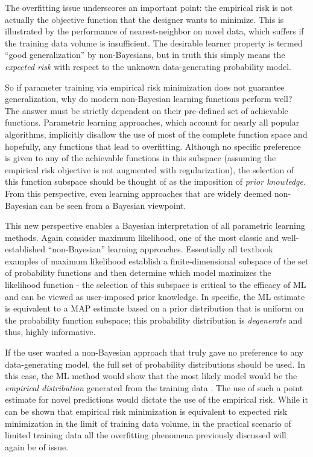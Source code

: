 \documentclass[12pt]{article}
\begin{document}
The overfitting issue underscores an important point: the empirical risk is not actually the objective function that the designer wants to minimize. This is illustrated by the performance of nearest-neighbor on novel data, which suffers if the training data volume is insufficient. The desirable learner property is termed ``good generalization'' by non-Bayesians, but in truth this simply means the \emph{expected risk} with respect to the unknown data-generating probability model. 

So if parameter training via empirical risk minimization does not guarantee generalization, why do modern non-Bayesian learning functions perform well? The answer must be strictly dependent on their pre-defined set of achievable functions. Parametric learning approaches, which account for nearly all popular algorithms, implicitly disallow the use of most of the complete function space and hopefully, any functions that lead to overfitting. Although no specific preference is given to any of the achievable functions in this subspace (assuming the empirical risk objective is not augmented with regularization), the selection of this function subspace should be thought of as the imposition of \emph{prior knowledge}. From this perspective, even learning approaches that are widely deemed non-Bayesian can be seen from a Bayesian viewpoint.

This new perspective enables a Bayesian interpretation of all parametric learning methods. Again consider maximum likelihood, one of the most classic and well-established ``non-Bayesian'' learning approaches. Essentially all textbook examples of maximum likelihood establish a finite-dimensional subspace of the set of probability functions and then determine which model maximizes the likelihood function \cite{papoulis} - the selection of this subspace is critical to the efficacy of ML and can be viewed as user-imposed prior knowledge. In specific, the ML estimate is equivalent to a MAP estimate based on a prior distribution that is uniform on the probability function subspace; this probability distribution is \emph{degenerate} and thus, highly informative.

If the user wanted a non-Bayesian approach that truly gave no preference to any data-generating model, the full set of probability distributions should be used. In this case, the ML method would show that the most likely model would be the \emph{empirical distribution} generated from the training data \cite{rao}. The use of such a point estimate for novel predictions would dictate the use of the empirical risk. While it can be shown that empirical risk minimization is equivalent to expected risk minimization in the limit of training data volume, in the practical scenario of limited training data all the overfitting phenomena previously discussed will again be of issue. 
\end{document}

